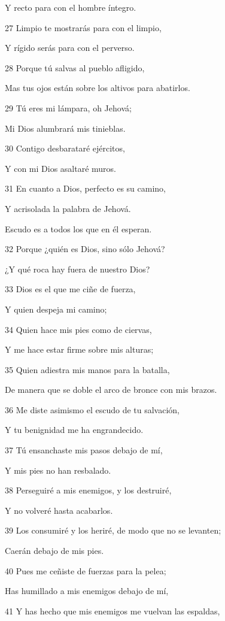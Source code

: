 \par Y recto para con el hombre íntegro.
\par 27 Limpio te mostrarás para con el limpio,
\par Y rígido serás para con el perverso.
\par 28 Porque tú salvas al pueblo afligido,
\par Mas tus ojos están sobre los altivos para abatirlos. 
\par 29 Tú eres mi lámpara, oh Jehová; 
\par Mi Dios alumbrará mis tinieblas.
\par 30 Contigo desbarataré ejércitos,
\par Y con mi Dios asaltaré muros.
\par 31 En cuanto a Dios, perfecto es su camino,
\par Y acrisolada la palabra de Jehová.
\par Escudo es a todos los que en él esperan.
\par 32 Porque ¿quién es Dios, sino sólo Jehová?
\par ¿Y qué roca hay fuera de nuestro Dios?
\par 33 Dios es el que me ciñe de fuerza,
\par Y quien despeja mi camino;
\par 34 Quien hace mis pies como de ciervas, 
\par Y me hace estar firme sobre mis alturas;
\par 35 Quien adiestra mis manos para la batalla,
\par De manera que se doble el arco de bronce con mis brazos.
\par 36 Me diste asimismo el escudo de tu salvación,
\par Y tu benignidad me ha engrandecido.
\par 37 Tú ensanchaste mis pasos debajo de mí,
\par Y mis pies no han resbalado. 
\par 38 Perseguiré a mis enemigos, y los destruiré,
\par Y no volveré hasta acabarlos.
\par 39 Los consumiré y los heriré, de modo que no se levanten;
\par Caerán debajo de mis pies.
\par 40 Pues me ceñiste de fuerzas para la pelea;
\par Has humillado a mis enemigos debajo de mí,
\par 41 Y has hecho que mis enemigos me vuelvan las espaldas,
